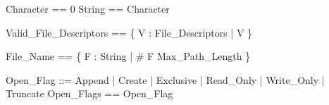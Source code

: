 \pagestyle{empty}

\begin{zed}
Character == 0 
\also
String == \seq Character
\end{zed}
\begin{zed}
Valid\_File\_Descriptors == \{ V : File\_Descriptors | V  \}
\end{zed}
\begin{zed}
File\_Name == \{ F : String | \# F \leq Max\_Path\_Length \}
\end{zed}
\begin{zed}
Open\_Flag ::= Append | Create | Exclusive | Read\_Only | Write\_Only | Truncate
\also
Open\_Flags == \power Open\_Flag
\end{zed}

